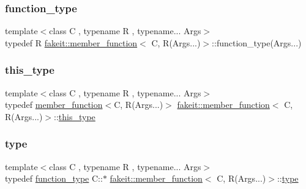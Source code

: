 \subsubsection{\texorpdfstring{function\_type}{function\_type}}
{\footnotesize\ttfamily template$<$class C , typename R , typename... Args$>$ \\
typedef R \mbox{\hyperlink{classfakeit_1_1member__function}{fakeit\+::member\+\_\+function}}$<$ C, R(Args...)$>$\+::function\+\_\+type(Args...)}

\mbox{\label{classfakeit_1_1member__function_3_01C_00_01R_07Args_8_8_8_08_4_a2f0619303f6394749b3d110408a6945a}} 
\subsubsection{\texorpdfstring{this\_type}{this\_type}}
{\footnotesize\ttfamily template$<$class C , typename R , typename... Args$>$ \\
typedef \mbox{\hyperlink{classfakeit_1_1member__function}{member\+\_\+function}}$<$C, R(Args...)$>$ \mbox{\hyperlink{classfakeit_1_1member__function}{fakeit\+::member\+\_\+function}}$<$ C, R(Args...)$>$\+::\mbox{\hyperlink{classfakeit_1_1member__function_3_01C_00_01R_07Args_8_8_8_08_4_a2f0619303f6394749b3d110408a6945a}{this\+\_\+type}}}

\mbox{\label{classfakeit_1_1member__function_3_01C_00_01R_07Args_8_8_8_08_4_a21761d9e5d16d880e677d266fc331aaa}} 
\subsubsection{\texorpdfstring{type}{type}}
{\footnotesize\ttfamily template$<$class C , typename R , typename... Args$>$ \\
typedef \mbox{\hyperlink{classfakeit_1_1member__function_3_01C_00_01R_07Args_8_8_8_08_4_adec3af2f7a23e90ba69d1e7d65369908}{function\+\_\+type}} C\+::$\ast$ \mbox{\hyperlink{classfakeit_1_1member__function}{fakeit\+::member\+\_\+function}}$<$ C, R(Args...)$>$\+::\mbox{\hyperlink{classfakeit_1_1member__function_3_01C_00_01R_07Args_8_8_8_08_4_a21761d9e5d16d880e677d266fc331aaa}{type}}}



